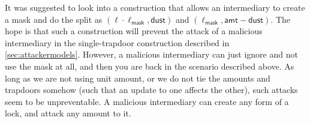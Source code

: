 It was suggested to look into a construction that allows an intermediary to create a mask and 
do the split as $(\ell \cdot \ell_\mathsf{mask}, \mathsf{dust})$ and $(\ell_\mathsf{mask}, 
\mathsf{amt}-\mathsf{dust})$. The hope is that such a construction will prevent the attack of 
a malicious intermediary in the single-trapdoor construction described in 
\cref{sec:attackermodels}. However, a malicious intermediary can just ignore and not use the 
mask at all, and then you are back in the scenario described above. As long as we are not using 
unit amount, or we do not tie the amounts and trapdoors somehow (such that an update to one 
affects the other), such attacks seem to be unpreventable. A malicious intermediary can create 
any form of a lock, and attack any amount to it. 


\clearpage